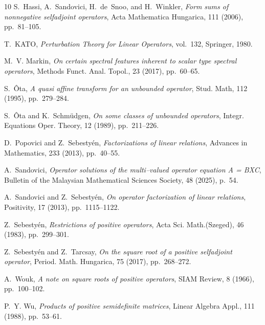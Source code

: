 \documentclass{amsart}
\numberwithin{equation}{section}
\begin{document}
\begin{thebibliography}{10}
{\sc S.~Hassi, A.~Sandovici, H.~de~Snoo, and H.~Winkler}, {\em Form sums of
  nonnegative selfadjoint operators}, Acta Mathematica Hungarica, 111 (2006),
  pp.~81--105.

{\sc T.~KATO}, {\em Perturbation Theory for Linear Operators}, vol.~132,
  Springer, 1980.

{\sc M.~V. Markin}, {\em {On certain spectral features inherent to scalar type
  spectral operators}}, Methods Funct. Anal. Topol., 23 (2017), pp.~60--65.

{\sc S.~{\^{O}}ta}, {\em {A quasi affine transform for an unbounded operator}},
  Stud. Math, 112 (1995), pp.~279--284.

{\sc S.~{\^{O}}ta and K.~Schm{\"{u}}dgen}, {\em {On some classes of unbounded
  operators}}, Integr. Equations Oper. Theory, 12 (1989), pp.~211--226.

{\sc D.~Popovici and Z.~Sebesty{\'e}n}, {\em Factorizations of linear
  relations}, Advances in Mathematics, 233 (2013), pp.~40--55.

{\sc A.~Sandovici}, {\em Operator solutions of the multi--valued operator
  equation {A} = {BXC}}, Bulletin of the Malaysian Mathematical Sciences
  Society, 48 (2025), p.~54.

{\sc A.~Sandovici and Z.~Sebesty{\'{e}}n}, {\em {On operator factorization of
  linear relations}}, Positivity, 17 (2013), pp.~1115--1122.

{\sc Z.~Sebesty{\'e}n}, {\em Restrictions of positive operators}, Acta Sci.
  Math.(Szeged), 46 (1983), pp.~299--301.

{\sc Z.~Sebesty{\'{e}}n and Z.~Tarcsay}, {\em {On the square root of a positive
  selfadjoint operator}}, Period. Math. Hungarica, 75 (2017), pp.~268--272.

{\sc A.~Wouk}, {\em A note on square roots of positive operators}, SIAM Review,
  8 (1966), pp.~100--102.

{\sc P.~Y. Wu}, {\em {Products of positive semideﬁnite matrices}}, Linear
  Algebra Appl., 111 (1988), pp.~53--61.

\end{thebibliography}
\end{document}
